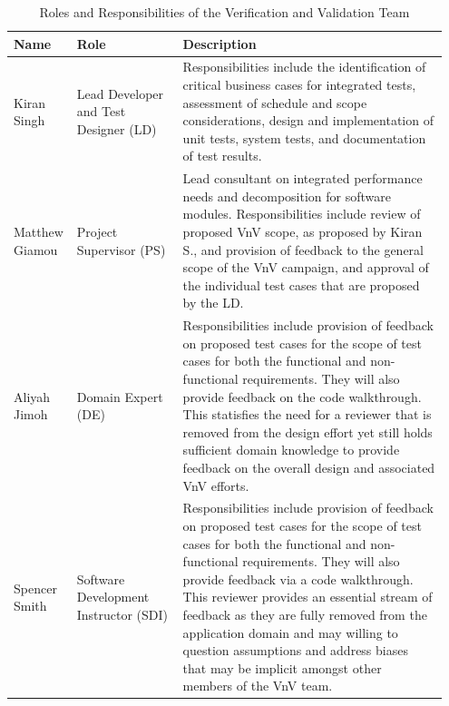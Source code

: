 \documentclass[12pt, titlepage]{article}
\begin{document}
\begin{table}[tbp!]
  \centering
  \begin{tabular}{|p{0.11\linewidth}|p{0.24\linewidth}|p{0.6\linewidth}|} 
    \hline
    \textbf{Name} & \textbf{Role} & \textbf{Description}\\
    \hline
    Kiran Singh & Lead Developer and Test Designer (LD) & Responsibilities include the
    identification of critical business cases for integrated tests, assessment of 
    schedule and scope considerations,  design and implementation of unit tests, 
    system tests, and documentation of test results.\\
    \hline
    Matthew Giamou & Project Supervisor (PS) & Lead consultant on integrated 
    performance needs and decomposition for software modules. Responsibilities 
    include review of proposed VnV scope, as proposed by 
    Kiran S., and provision of feedback to the general scope of the VnV campaign, and approval 
    of the individual test cases that are proposed by the LD. \\
    \hline
    Aliyah Jimoh & Domain Expert (DE) & Responsibilities include provision of 
    feedback on proposed test cases for the 
    scope of test cases for both the functional and non-functional requirements. They 
    will also provide feedback on the code walkthrough. 
    This statisfies the need for a reviewer that is removed from the design effort yet
    still holds sufficient domain knowledge to provide feedback on the overall design 
    and associated VnV efforts.\\ 
    \hline
    Spencer Smith & Software Development Instructor (SDI) & Responsibilities include 
    provision of feedback on proposed test cases for the scope of test cases 
    for both the functional and non-functional requirements. They will also 
    provide feedback via a code walkthrough. 
    This reviewer provides an essential stream of feedback as they are fully removed 
    from the application domain and may willing to question assumptions and address biases 
    that may be implicit amongst other members of the VnV team.\\
    \bottomrule
  \end{tabular}\\
  \caption{Roles and Responsibilities of the Verification and Validation Team}
  \label{Table_Ver_Roles}
\end{table}
\end{document}
